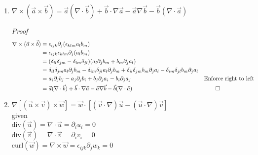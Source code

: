 \documentclass[11pt,twoside]{article}
\renewcommand{\d}{\partial}
\newcommand{\vect}[1]{\vec{#1}}
\newcommand{\grad}{\nabla}
\newcommand{\cross}{\times}
\newcommand{\curl}{\mbox{curl}}
\newcommand{\divf}{\mbox{div}}
\begin{document}
\begin{enumerate}
%
%
\item $\grad\cross(\vect{a}\cross\vect{b}) = \vect{a}(\grad\cdot\vect{b})+\vect{b}\cdot\grad\vect{a}-\vect{a}\grad\vect{b}-\vect{b}(\grad\cdot\vect{a})$

\textit{Proof}
\begin{align*}
\grad\cross(\vect{a}\cross\vect{b}) & = \epsilon_{ijk}\d_j(\epsilon_{klm}a_lb_m)\\
                                    & = \epsilon_{ijk}\epsilon_{klm}\d_j(a_lb_m)\\
                                    & = (\delta_{il}\delta_{jm}-\delta_{im}\delta_{jl})(a_l\d_jb_m+b_m\d_ja_l)\\
                                    & = \delta_{il}\delta_{jm}a_l\d_jb_m-\delta_{im}\delta_{jl}a_l\d_jb_m+ \delta_{il}\delta_{jm}b_m\d_ja_l - \delta_{im}\delta_{jl}b_m\d_ja_l\\
                                    & = a_i\d_jb_j-a_j\d_jb_i+b_j\d_ja_i-b_i\d_ja_j &&\text{Enforce right to left}\\
                                    & = \vect{a}(\grad\cdot\vect{b})+\vect{b}\cdot\grad\vect{a}-\vect{a}\grad\vect{b}-\vect{b}(\grad\cdot\vect{a}) && \qed
\end{align*}


%
%
\item $\grad[(\vect{u}\cross\vect{v})\cross\vect{w}] = \vect{w}\cdot[(\vect{v}\cdot\grad)\vect{u}-(\vect{u}\cdot\grad)\vect{v}]$ \\
given \\ 
$\divf(\vect{u})=\grad\cdot\vect{u}=\d_iu_i=0$\\ 
$\divf(\vect{v})=\grad\cdot\vect{v}=\d_iv_i=0$\\ 
$\curl(\vect{w})=\grad\cross\vect{w}=\epsilon_{ijk}\d_jw_k=0$


\end{enumerate}
\end{document}
